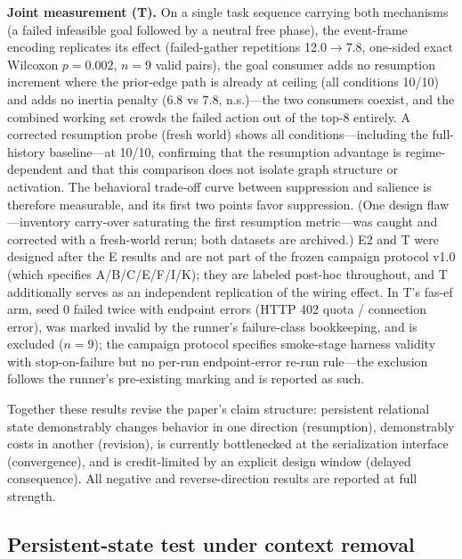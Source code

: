 \documentclass[10pt,a4paper]{article}
\begin{document}
\textbf{Joint measurement (T).} On a single task sequence carrying
both mechanisms (a failed infeasible goal followed by a neutral free
phase), the event-frame encoding replicates its effect
(failed-gather repetitions 12.0$\rightarrow$7.8, one-sided exact
Wilcoxon $p{=}0.002$, $n{=}9$ valid pairs), the goal consumer adds no resumption increment where the
prior-edge path is already at ceiling (all conditions 10/10) and adds
no inertia penalty (6.8 vs 7.8, n.s.)---the two consumers coexist, and
the combined working set crowds the failed action out of the top-8
entirely. A corrected resumption probe (fresh world) shows all
conditions---including the full-history baseline---at 10/10, confirming
that the resumption advantage is regime-dependent and that this
comparison does not isolate graph structure or activation.
The behavioral trade-off curve between suppression and
salience is therefore measurable, and its first two points favor
suppression. (One design flaw---inventory carry-over saturating the first resumption metric---was caught and corrected with a fresh-world rerun; both datasets are archived.) E2 and T were designed after the E results and are not part of the frozen campaign protocol v1.0 (which specifies A/B/C/E/F/I/K); they are labeled post-hoc throughout, and T additionally serves as an independent replication of the wiring effect. In T's fas-ef arm, seed 0 failed twice with endpoint errors (HTTP 402 quota / connection error), was marked invalid by the runner's failure-class bookkeeping, and is excluded ($n{=}9$); the campaign protocol specifies smoke-stage harness validity with stop-on-failure but no per-run endpoint-error re-run rule---the exclusion follows the runner's pre-existing marking and is reported as such.

Together these results revise the paper's claim structure: persistent
relational state demonstrably changes behavior in one direction
(resumption), demonstrably costs in another (revision), is currently
bottlenecked at the serialization interface (convergence), and is
credit-limited by an explicit design window (delayed consequence).
All negative and reverse-direction results are reported at full
strength.

\subsection{Persistent-state test under context removal}
\label{sec:res-psa}
\end{document}
